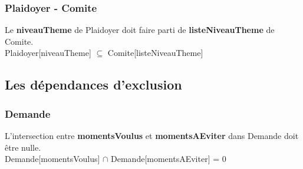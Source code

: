 \subsubsection*{Plaidoyer - Comite}
Le \textbf{niveauTheme} de Plaidoyer doit faire parti de \textbf{listeNiveauTheme} de Comite.\\
\indent \indent Plaidoyer[niveauTheme] $ \subseteq $ Comite[listeNiveauTheme]

\subsection{Les dépendances d'exclusion}

\subsubsection*{Demande}
L'intersection entre \textbf{momentsVoulus} et \textbf{momentsAEviter} dans Demande doit être nulle. \\
\indent \indent Demande[momentsVoulus] $ \cap $ Demande[momentsAEviter] = 0

